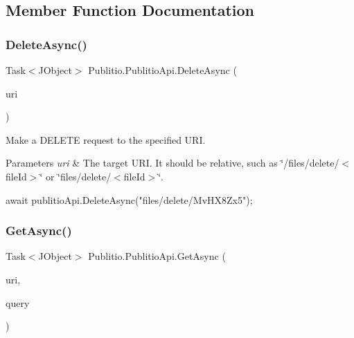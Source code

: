 \subsection{Member Function Documentation}
\mbox{\label{classPublitio_1_1PublitioApi_a313b32f45d254eac9e2b91de60622bc9}} 
\subsubsection{\texorpdfstring{Delete\+Async()}{DeleteAsync()}}
{\footnotesize\ttfamily Task$<$J\+Object$>$ Publitio.\+Publitio\+Api.\+Delete\+Async (\begin{DoxyParamCaption}\item[{string}]{uri }\end{DoxyParamCaption})}



Make a D\+E\+L\+E\+TE request to the specified U\+RI.


\begin{DoxyParams}{Parameters}
{\em uri} & The target U\+RI. It should be relative, such as \char`\"{}/files/delete/$<$file\+Id$>$\char`\"{} or \char`\"{}files/delete/$<$file\+Id$>$\char`\"{}.\\
\hline
\end{DoxyParams}



\begin{DoxyCode}
await publitioApi.DeleteAsync(\textcolor{stringliteral}{"files/delete/MvHX8Zx5"});
\end{DoxyCode}
 \mbox{\label{classPublitio_1_1PublitioApi_ac85f19513ef13229beb581bd9ade024d}} 
\subsubsection{\texorpdfstring{Get\+Async()}{GetAsync()}}
{\footnotesize\ttfamily Task$<$J\+Object$>$ Publitio.\+Publitio\+Api.\+Get\+Async (\begin{DoxyParamCaption}\item[{string}]{uri,  }\item[{I\+Enumerable$<$ Key\+Value\+Pair$<$ string, object $>$$>$}]{query }\end{DoxyParamCaption})}



